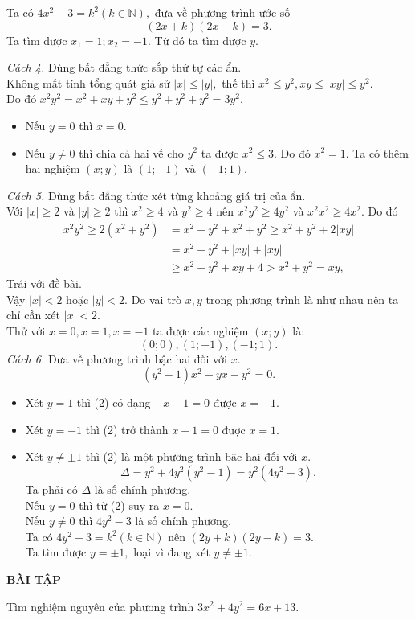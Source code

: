 \begin{vd}
{\begin{itemize}
Ta có $4x^2-3=k^2 (k\in\mathbb{N}),$ đưa về phương trình ước số
$$(2x+k)(2x-k)=3.$$
Ta tìm được $x_1=1;x_2=-1.$ Từ đó ta tìm được $y.$
\end{itemize}
\textit{Cách 4. } Dùng bất đẳng thức sắp thứ tự các ẩn.\\
Không mất tính tổng quát giả sử $|x|\leq |y|,$ thế thì $x^2\leq y^2, xy\leq |xy|\leq y^2.$\\
Do đó $x^2y^2=x^2+xy+y^2\leq y^2+y^2+y^2=3y^2.$\\
\begin{itemize}
\item Nếu $y=0$ thì $x=0.$
\item Nếu $y\neq 0$ thì chia cả hai vế cho $y^2$ ta được $x^2\leq 3$. Do đó $x^2=1$. Ta có thêm hai nghiệm $(x;y)$ là $(1;-1)$ và $(-1;1)$.
\end{itemize}
\textit{Cách 5.} Dùng bất đẳng thức xét từng khoảng giá trị của ẩn.\\
Với $|x|\geq 2$ và $|y|\geq 2$ thì $x^2\geq 4$ và $y^2\geq 4$ nên $x^2y^2\geq 4y^2$ và $x^2x^2\geq 4 x^2.$ 
Do đó
$$\begin{array}{rl}
x^2y^2\geq 2(x^2+y^2)&=x^2+y^2+x^2+y^2\geq x^2+y^2+2|xy|\\
&=x^2+y^2+|xy|+|xy|\\
&\geq x^2+y^2+xy+4>x^2+y^2=xy,
\end{array}$$
Trái với đề bài.\\
Vậy $|x|<2$ hoặc $|y|<2$.
Do vai trò $x,y$ trong phương trình là như nhau nên ta chỉ cần xét $|x|<2$.\\
Thử với $x=0,x=1, x=-1$ ta được các nghiệm $(x;y)$ là:
$$(0;0), (1;-1), (-1;1).$$
\textit{Cách 6.} Đưa về phương trình bậc hai đối với $x$.
\[(y^2-1)x^2-yx-y^2=0.\tag{2}\]
\begin{itemize}
\item Xét $y=1$ thì (2) có dạng $-x-1=0$ được $x=-1$.
\item Xét $y=-1$ thì (2) trở thành $x-1=0$ được $x=1.$
\item Xét $y\neq \pm 1$ thì (2) là một phương trình bậc hai đối với $x.$
$$\Delta =y^2+4y^2(y^2-1)=y^2(4y^2-3).$$
Ta phải có $\Delta $ là số chính phương.\\
Nếu $y=0$ thì từ (2) suy ra $x=0.$\\
Nếu $y\neq 0$ thì $4y^2-3$ là số chính phương.\\
Ta có $4y^2-3=k^2 (k\in\mathbb{N})$ nên $(2y+k)(2y-k)=3.$\\
Ta tìm được $y=\pm 1,$ loại vì đang xét $y\neq \pm 1.$
\end{itemize}
}
\end{vd}
\begin{center}
    \textbf{BÀI TẬP}
\end{center}
\begin{bt}
Tìm nghiệm nguyên của phương trình $3x^2+4y^2=6x+13$.
\end{bt}
  
